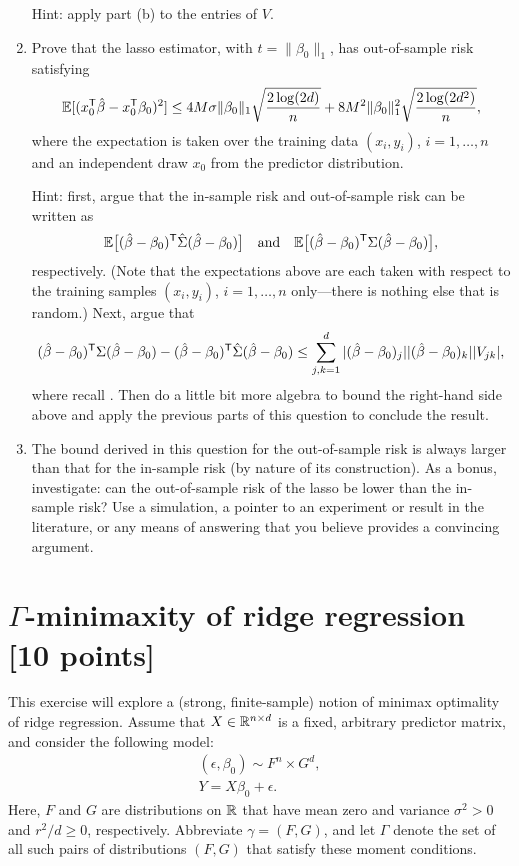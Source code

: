 \documentclass{article}
\begin{document}
\begin{enumerate}[label=(\alph*)]
  Hint: apply part (b) to the entries of $V$.

\item Prove that the lasso estimator, with $t=\|\beta_0\|_1$, has out-of-sample
  risk satisfying 
  \marginpar{\small [5 pts]}
  \[
  \mathbb{E}[(x_0^{\mathsf{T}} \hat{\beta} - x_0^{\mathsf{T}} \beta_0)^2] \leq 4M \sigma \|\beta_0\|_1
  \sqrt{\frac{2 \log(2d)}{n}} + 8 M^2 \|\beta_0\|_1^2 \sqrt{\frac{2
      \log(2d^2)}{n}},  
  \]
  where the expectation is taken over the training data $(x_i,y_i)$,
  $i=1,\dots,n$ and an independent draw $x_0$ from the predictor distribution. 

  Hint: first, argue that the in-sample risk and out-of-sample risk can be
  written as 
  \[
  \mathbb{E}\big[ (\hat{\beta}-\beta_0)^{\mathsf{T}} \hat\Sigma (\hat{\beta}-\beta_0) \big] 
  \quad \text{and} \quad
  \mathbb{E}\big[ (\hat{\beta}-\beta_0)^{\mathsf{T}} \Sigma (\hat{\beta}-\beta_0) \big],
  \]
  respectively. (Note that the expectations above are each taken with respect to
  the training samples $(x_i,y_i)$, $i=1,\dots,n$ only---there is nothing else
  that is random.) Next, argue that  
  \[
  (\hat{\beta}-\beta_0)^{\mathsf{T}} \Sigma (\hat{\beta}-\beta_0) -
  (\hat{\beta}-\beta_0)^{\mathsf{T}} \hat\Sigma (\hat{\beta}-\beta_0) 
  \leq \sum_{j,k=1}^d |(\hat{\beta}-\beta_0)_j| |(\hat{\beta}-\beta_0)_k| |V_{jk}|,
  \]
  where recall . Then do a little bit
  more algebra to bound the right-hand side above and apply the previous parts
  of this question to conclude the result. 

\item The bound derived in this question for the out-of-sample risk is always
  larger than that for the in-sample risk (by nature of its construction). As a
  bonus, investigate: can the out-of-sample risk of the lasso be lower than the
  in-sample risk? Use a simulation, a pointer to an experiment or result in the
  literature, or any means of answering that you believe provides a convincing 
  argument.   
\end{enumerate}

\section{$\Gamma$-minimaxity of ridge regression [10 points]} 

\def\Risk{\mathrm{Risk}}

This exercise will explore a (strong, finite-sample) notion of minimax
optimality of ridge regression. Assume that $X \in \mathbb{R}^{n \times d}$ is a fixed,
arbitrary predictor matrix, and consider the following model:  
\begin{equation}
\label{eq:model}
\begin{gathered}
(\epsilon, \beta_0) \sim F^n \times G^d, \\
Y = X\beta_0 + \epsilon.
\end{gathered}
\end{equation}
Here, $F$ and $G$ are distributions on $\mathbb{R}$ that have mean zero and variance
$\sigma^2 > 0$ and $r^2 / d \geq 0$, respectively. Abbreviate $\gamma = (F,G)$,
and let $\Gamma$ denote the set of all such pairs of distributions $(F,G)$ that 
satisfy these moment conditions. 
\end{document}
